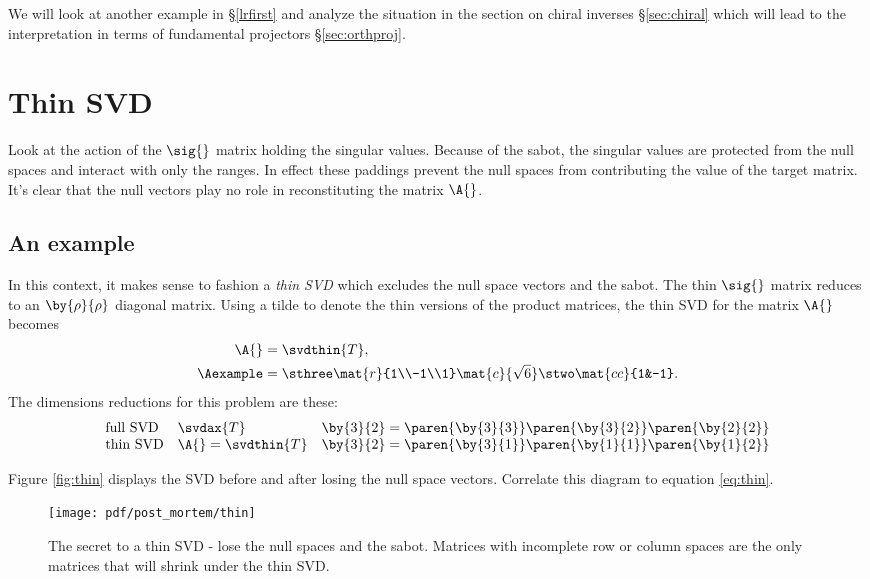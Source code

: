 We will look at another example in \S\eqref{lrfirst} and analyze the situation in the section on chiral inverses \S\eqref{sec:chiral} which will lead to the interpretation in terms of fundamental projectors \S\eqref{sec:orthproj}.

\section{Thin SVD}
Look at the action of the $\sig{}$ matrix holding the singular values. Because of the sabot, the singular values are protected from the null spaces and interact with only the ranges. In effect these paddings prevent the null spaces from contributing the value of the target matrix. It's clear that the null vectors play no role in reconstituting the matrix $\A{}$.

\subsection{An example}
In this context, it makes sense to fashion a \textit{thin SVD} which excludes the null space vectors and the sabot. The thin $\sig{}$ matrix reduces to an $\by{\rho}{\rho}$ diagonal matrix. Using a tilde to denote the thin versions of the product matrices, the thin SVD for the matrix $\A{}$ becomes
\begin{equation}
  \begin{split}
    \A{} &= \svdthin{T},\\
    \Aexample & = \sthree \mat{r}{1\\-1\\1}\mat{c}{\sqrt{6}}\stwo\mat{cc}{1&-1}.
  \end{split}
  \label{eq:thin}
\end{equation}
The dimensions reductions for this problem are these:
$$
\begin{array}{lll}
\text{full SVD} & \svdax{T} & \by{3}{2} = \paren{\by{3}{3}}\paren{\by{3}{2}}\paren{\by{2}{2}} \\
\text{thin SVD} & \A{} = \svdthin{T} & \by{3}{2} = \paren{\by{3}{1}}\paren{\by{1}{1}}\paren{\by{1}{2}} \\
\end{array}
$$

Figure \eqref{fig:thin} displays the SVD before and after losing the null space vectors. Correlate this diagram to equation \eqref{eq:thin}.
\begin{figure}[htbp] %
   \centering
   \texttt{[image: pdf/post\_mortem/thin]} 
   \caption[The secret to a thin SVD]{The secret to a thin SVD - lose the null spaces and the sabot. Matrices with incomplete row or column spaces are the only matrices that will shrink under the thin SVD.}
   \label{fig:thin}
\end{figure}

